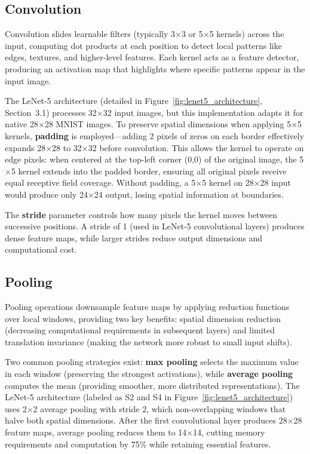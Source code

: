 \documentclass[12pt,a4paper]{report}
\begin{document}
\subsection{Convolution}

Convolution slides learnable filters (typically 3$\times$3 or 5$\times$5 kernels) across the input, computing dot products at each position to detect local patterns like edges, textures, and higher-level features. Each kernel acts as a feature detector, producing an activation map that highlights where specific patterns appear in the input image.

The LeNet-5 architecture (detailed in Figure~\ref{fig:lenet5_architecture}, Section~3.1) processes 32$\times$32 input images, but this implementation adapts it for native 28$\times$28 MNIST images. To preserve spatial dimensions when applying 5$\times$5 kernels, \textbf{padding} is employed—adding 2 pixels of zeros on each border effectively expands 28$\times$28 to 32$\times$32 before convolution. This allows the kernel to operate on edge pixels: when centered at the top-left corner (0,0) of the original image, the 5$\times$5 kernel extends into the padded border, ensuring all original pixels receive equal receptive field coverage. Without padding, a 5$\times$5 kernel on 28$\times$28 input would produce only 24$\times$24 output, losing spatial information at boundaries.

The \textbf{stride} parameter controls how many pixels the kernel moves between successive positions. A stride of 1 (used in LeNet-5 convolutional layers) produces dense feature maps, while larger strides reduce output dimensions and computational cost.

\subsection{Pooling}

Pooling operations downsample feature maps by applying reduction functions over local windows, providing two key benefits: spatial dimension reduction (decreasing computational requirements in subsequent layers) and limited translation invariance (making the network more robust to small input shifts).

Two common pooling strategies exist: \textbf{max pooling} selects the maximum value in each window (preserving the strongest activations), while \textbf{average pooling} computes the mean (providing smoother, more distributed representations). The LeNet-5 architecture (labeled as S2 and S4 in Figure~\ref{fig:lenet5_architecture}) uses 2$\times$2 average pooling with stride 2, which non-overlapping windows that halve both spatial dimensions. After the first convolutional layer produces 28$\times$28 feature maps, average pooling reduces them to 14$\times$14, cutting memory requirements and computation by 75\% while retaining essential features.
\end{document}
